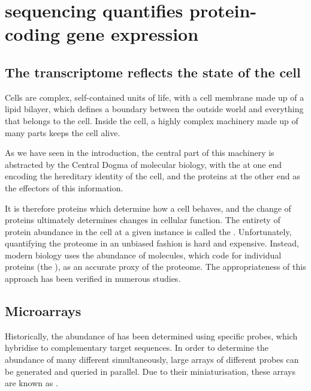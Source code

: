 \chapter{ sequencing quantifies protein-coding gene expression}

\section{The transcriptome reflects the state of the cell}

Cells are complex, self-contained units of life, with a cell membrane made up of
a lipid bilayer, which defines a boundary between the outside world and
everything that belongs to the cell. Inside the cell, a highly complex machinery
made up of many parts keeps the cell alive.

As we have seen in the introduction, the central part of this machinery is
abstracted by the Central Dogma of molecular biology, with the \dna at one end
encoding the hereditary identity of the cell, and the proteins at the other end
as the effectors of this information.

It is therefore proteins which determine how a cell behaves, and the change of
proteins ultimately determines changes in cellular function. The entirety of
protein abundance in the cell at a given instance is called the
. Unfortunately, quantifying the proteome in an unbiased
fashion is hard and expensive. Instead, modern biology uses the
abundance of \mrna molecules, which code for individual proteins (the
), as an accurate proxy of the proteome. The
appropriateness of this approach has been verified in numerous
studies.


\section{Microarrays}

Historically, the abundance of \mrna has been determined using specific probes,
which hybridise to complementary target \mrna sequences. In order to determine
the abundance of many different \mrna[s] simultaneously, large arrays of
different probes can be generated and queried in parallel. Due to their
miniaturisation, these arrays are known as .

